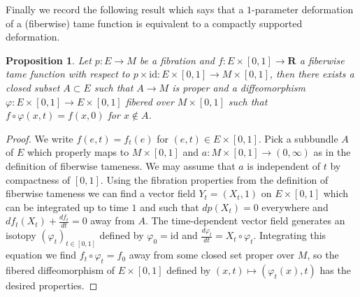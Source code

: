 \documentclass[12pt,a4paper]{article}
\numberwithin{equation}{section}
\newtheorem{prop}[equation]{Proposition}
\theoremstyle{definition}
\theoremstyle{remark}
\newcommand{\R}{\mathbf{R}}
\newcommand{\id}{\mathrm{id}}
\begin{document}
Finally we record the following result which says that a $1$-parameter deformation of a (fiberwise) tame function is equivalent to a compactly supported deformation.

\begin{prop}\label{prop:tamedeformation}
Let $p:E\to M$ be a fibration and $f:E\times[0,1]\to \R$ a fiberwise tame function with respect to $p\times \id:E\times [0,1]\to M\times[0,1]$,
then there exists a closed subset $A\subset E$ such that $A\to M$ is proper and a diffeomorphism $\varphi:E\times [0,1]\to E\times [0,1]$
fibered over $M\times [0,1]$ such that $f\circ \varphi(x,t)=f(x,0)$ for $x\not\in A$.
\end{prop}
\begin{proof}
We write $f(e,t)=f_t(e)$ for $(e,t) \in E\times [0,1]$.
Pick a subbundle $A$ of $E$ which properly maps to $M\times[0,1]$ and $a:M\times [0,1]\to (0,\infty)$ as in the definition of fiberwise tameness. We may assume that $a$ is independent of $t$ by compactness of $[0,1]$. Using the fibration properties from the definition of fiberwise tameness we can find a vector field $Y_t=(X_t,1)$ on $E\times [0,1]$ which can be integrated up to time $1$ and such that $dp(X_t)=0$ everywhere and $df_t(X_t)+ \frac{df_t}{dt}=0$ away from $A$. The time-dependent vector field generates an isotopy $(\varphi_t)_{t\in [0,1]}$ defined by $\varphi_0=\id$ and $\frac{d \varphi_t}{dt}=X_t\circ\varphi_t$. Integrating this equation we find $f_t\circ \varphi_t = f_0$ away from some closed set proper over $M$, so the fibered diffeomorphism of $E\times [0,1]$ defined by $(x,t)\mapsto (\varphi_t(x),t)$ has the desired properties.
\end{proof}



\end{document}
